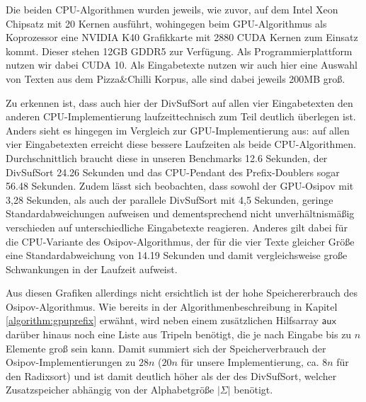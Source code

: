 Die beiden CPU-Algorithmen wurden jeweils, wie zuvor, auf dem Intel\textsuperscript{\textregistered} Xeon\textsuperscript{\textregistered} Chipsatz mit 20 Kernen ausführt, wohingegen beim GPU-Algorithmus als Koprozessor eine NVIDIA\textsuperscript{\textregistered} K40 Grafikkarte mit 2880 CUDA Kernen zum Einsatz kommt. Dieser stehen 12GB GDDR5 zur Verfügung. Als Programmierplattform nutzen wir dabei CUDA 10. Als Eingabetexte nutzen wir auch hier eine Auswahl von Texten aus dem Pizza$\&$Chilli Korpus, alle sind dabei jeweils 200MB groß.

Zu erkennen ist, dass auch hier der DivSufSort auf allen vier Eingabetexten den anderen CPU-Implementierung laufzeittechnisch zum Teil deutlich überlegen ist. Anders sieht es hingegen im Vergleich zur GPU-Implementierung aus: auf allen vier Eingabetexten erreicht diese bessere Laufzeiten als beide CPU-Algorithmen. Durchschnittlich braucht diese in unseren Benchmarks 12.6 Sekunden, der DivSufSort 24.26 Sekunden und das CPU-Pendant des Prefix-Doublers sogar 56.48 Sekunden. 
Zudem lässt sich beobachten, dass sowohl der GPU-Osipov mit 3,28 Sekunden, als auch der parallele DivSufSort mit 4,5 Sekunden, geringe Standardabweichungen aufweisen und dementsprechend nicht unverhältnismäßig verschieden auf unterschiedliche Eingabetexte reagieren. Anderes gilt dabei für die CPU-Variante des Osipov-Algorithmus, der für die vier Texte gleicher Größe eine Standardabweichung von 14.19 Sekunden und damit vergleichsweise große Schwankungen in der Laufzeit aufweist.

Aus diesen Grafiken allerdings nicht ersichtlich ist der hohe Speichererbrauch des Osipov-Algorithmus. Wie bereits in der Algorithmenbeschreibung in Kapitel \ref{algorithm:gpuprefix} erwähnt, wird neben einem zusätzlichen Hilfsarray $\mathsf{aux}$ darüber hinaus noch eine Liste aus Tripeln benötigt, die je nach Eingabe bis zu $n$ Elemente groß sein kann. Damit summiert sich der Speicherverbrauch der Osipov-Implementierungen zu $28n$ ($20n$ für unsere Implementierung, ca. $8n$ für den Radixsort) und ist damit deutlich höher als der des DivSufSort, welcher Zusatzspeicher abhängig von der Alphabetgröße $|\Sigma|$ benötigt.

